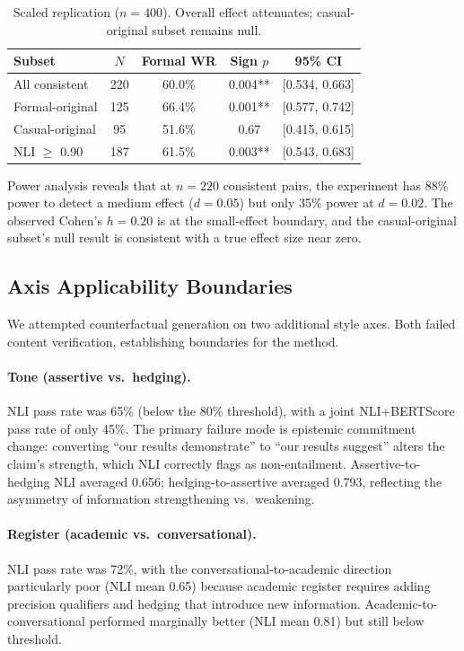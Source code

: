 \documentclass[11pt,a4paper]{article}
\begin{document}
\begin{table}[t]
\centering
\small
\caption{Scaled replication ($n=400$). Overall effect attenuates; casual-original subset remains null.}
\label{tab:scaled}
\begin{tabular}{lcccc}
\toprule
\textbf{Subset} & \textbf{$N$} & \textbf{Formal WR} & \textbf{Sign $p$} & \textbf{95\% CI} \\
\midrule
All consistent & 220 & 60.0\% & 0.004** & [0.534, 0.663] \\
Formal-original & 125 & 66.4\% & 0.001** & [0.577, 0.742] \\
Casual-original & 95 & 51.6\% & 0.67 & [0.415, 0.615] \\
NLI $\geq$ 0.90 & 187 & 61.5\% & 0.003** & [0.543, 0.683] \\
\bottomrule
\end{tabular}
\end{table}

Power analysis reveals that at $n=220$ consistent pairs, the experiment has 88\% power to detect a medium effect ($d=0.05$) but only 35\% power at $d=0.02$. The observed Cohen's $h=0.20$ is at the small-effect boundary, and the casual-original subset's null result is consistent with a true effect size near zero.

\subsection{Axis Applicability Boundaries}
\label{sec:axis_boundary}

We attempted counterfactual generation on two additional style axes. Both failed content verification, establishing boundaries for the method.

\paragraph{Tone (assertive vs.\ hedging).} NLI pass rate was 65\% (below the 80\% threshold), with a joint NLI+BERTScore pass rate of only 45\%. The primary failure mode is epistemic commitment change: converting ``our results demonstrate'' to ``our results suggest'' alters the claim's strength, which NLI correctly flags as non-entailment. Assertive-to-hedging NLI averaged 0.656; hedging-to-assertive averaged 0.793, reflecting the asymmetry of information strengthening vs.\ weakening.

\paragraph{Register (academic vs.\ conversational).} NLI pass rate was 72\%, with the conversational-to-academic direction particularly poor (NLI mean 0.65) because academic register requires adding precision qualifiers and hedging that introduce new information. Academic-to-conversational performed marginally better (NLI mean 0.81) but still below threshold.
\end{document}
